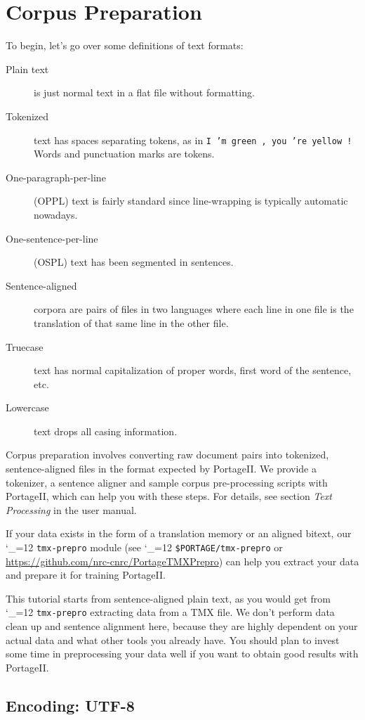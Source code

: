 \documentclass[11pt,letterpaper]{article}
\newcommand{\PS}{PortageII\xspace}
\def\code{\begingroup\catcode`\_=12 \codex}
\newcommand{\codex}[1]{\texttt{#1}\endgroup}
\begin{document}
\section{Corpus Preparation} \label{CorpusPreparation}

To begin, let's go over some definitions of text formats:
\begin{description}
  \item[Plain text] is just normal text in a flat file without formatting.
  \item[Tokenized] text has spaces separating tokens, as in \texttt{I 'm green
  , you 're yellow !} Words and punctuation marks are tokens.
  \item[One-paragraph-per-line] (OPPL) text is fairly standard since line-wrapping is
  typically automatic nowadays.
  \item[One-sentence-per-line] (OSPL) text has been segmented in sentences.
  \item[Sentence-aligned] corpora are pairs of files in two languages where
  each line in one file is the translation of that same line in the other file.
  \item[Truecase] text has normal capitalization of proper words, first word of
  the sentence, etc.
  \item[Lowercase] text drops all casing information.
\end{description}

Corpus preparation involves converting raw document pairs into tokenized,
sentence-aligned files in the format expected by \PS.  We provide a
tokenizer, a sentence aligner and sample corpus pre-processing scripts with
\PS, which can help you with these steps.  For details, see section \emph{Text
Processing} in the user manual.

If your data exists in the form of a translation memory or an aligned bitext,
our \code{tmx-prepro} module (see \code{\$PORTAGE/tmx-prepro} or
\url{https://github.com/nrc-cnrc/PortageTMXPrepro}) can help you extract
your data and prepare it for training \PS.

This tutorial starts from sentence-aligned plain text, as you would get from
\code{tmx-prepro} extracting data from a TMX file.
We don't perform data clean up and sentence alignment here,
because they are highly dependent on your actual data and what other tools you
already have.  You should plan to invest some time in preprocessing your data
well if you want to obtain good results with \PS.

\subsection{Encoding: UTF-8}
\end{document}
